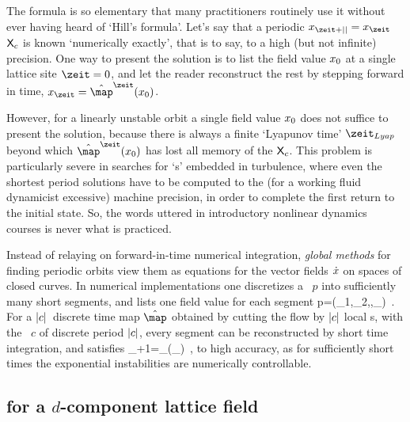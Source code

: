 The formula is so elementary that many practitioners routinely use it
without ever having heard of `Hill's formula'.
Let's say that a periodic $\ssp_{\zeit+\cl{}}=\ssp_\zeit$ {\lattstate}
$\mathsf{X}_c$ is known `numerically exactly', that is to say, to a high (but not
infinite) precision. One way to present the solution is to list the field
value $x_0$ at a single lattice site $\zeit=0$, and let the reader
reconstruct the rest by stepping forward in time,
$\ssp_{\zeit}=\hat{\map}^\zeit(\ssp_0)$.

However, for a linearly unstable orbit a single  field value $x_0$
does not suffice to present the solution, because there is always a finite
`Lyapunov time' $\zeit_{Lyap}$  beyond which $\hat{\map}^\zeit(\ssp_0)$
has lost all memory of the {\lattstate} $\mathsf{X}_c$. This problem is particularly
severe in searches for {`\ecs s'} embedded in turbulence, where even the
shortest period solutions have to be computed to the (for a working fluid
dynamicist excessive) machine
precision, in order to complete the
first return to the initial state. So, the words uttered in introductory
nonlinear dynamics courses is never what is practiced.

Instead of relaying on for\-ward-in-time numerical integration,
\emph{global methods} for finding periodic orbits view them
as equations for the vector fields $\dot{x}$ on spaces of closed
curves. In numerical implementations one discretizes a \po\  $p$ into
sufficiently many short
segments, and lists one
field value for each segment
\beq
p=(\ssp_1,\ssp_2,\cdots,\ssp_)
\,.
For a ${|c|}$\dmn\ discrete time map $\hat{\map}$ obtained by cutting the flow by
${|c|}$ local {\PoincSec s}, with the \po\ $c$ of discrete period ${|c|}$,
every segment can be reconstructed by short time integration, and
satisfies
\beq
\ssp_{\zeit+1}=\hat{\map}_\zeit(\ssp_\zeit)
\,,
to high accuracy, as for sufficiently short times the exponential
instabilities are numerically controllable.

\subsection{{\HillDet} for a $d$-component lattice field}
\label{s:LC21notHill}   %

